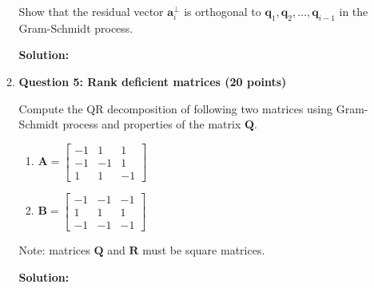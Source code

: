 \documentclass[11pt,letterpaper]{article}
\begin{document}
\begin{enumerate}
\begin{enumerate}
Show that the residual vector $\mathbf{a}_i^{\perp}$ is orthogonal to $\mathbf{q}_1, \mathbf{q}_2,\dots, \mathbf{q}_{i-1}$ in the Gram-Schmidt process.

\textbf{Solution:}

\newpage

\item[] \textbf{Question 5: Rank deficient matrices (20 points)}

Compute the QR decomposition of following two matrices using Gram-Schmidt process and properties of the matrix $\mathbf{Q}$.
\begin{enumerate}
    \item $\mathbf{A} = \begin{bmatrix}
-1 & 1 & 1\\
-1 & -1 & 1\\
1 & 1 & -1
\end{bmatrix}$
\item $\mathbf{B} = \begin{bmatrix}
-1 & -1 & -1\\
1 & 1 & 1\\
-1 & -1 & -1
\end{bmatrix}$
\end{enumerate}
Note: matrices $\mathbf{Q}$ and $\mathbf{R}$ must be square matrices.

\textbf{Solution:}



\end{enumerate}
\end{enumerate}
\end{document}
